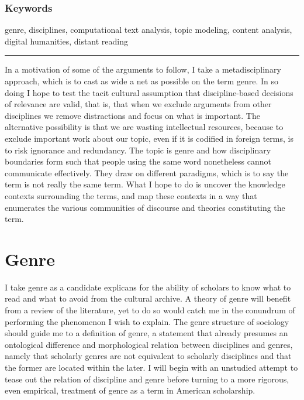 \documentclass[]{book}
\theoremstyle{definition}
\theoremstyle{definition}
\theoremstyle{definition}
\theoremstyle{remark}
\begin{document}
\hypertarget{keywords-2}{%
\subsubsection*{Keywords}\label{keywords-2}}


genre, disciplines, computational text analysis, topic
modeling, content analysis, digital humanities, distant reading

\begin{center}\rule{0.5\linewidth}{\linethickness}\end{center}

In a motivation of some of the arguments to follow, I take a
metadisciplinary approach, which is to cast as wide a net as possible on
the term genre. In so doing I hope to test the tacit cultural assumption
that discipline-based decisions of relevance are valid, that is, that
when we exclude arguments from other disciplines we remove distractions
and focus on what is important. The alternative possibility is that we
are wasting intellectual resources, because to exclude important work
about our topic, even if it is codified in foreign terms, is to risk
ignorance and redundancy. The topic is genre and how disciplinary
boundaries form such that people using the same word nonetheless cannot
communicate effectively. They draw on different paradigms, which is to
say the term is not really the same term. What I hope to do is uncover
the knowledge contexts surrounding the terms, and map these contexts in
a way that enumerates the various communities of discourse and theories
constituting the term.

\hypertarget{genre}{%
\section{Genre}\label{genre}}

I take genre as a candidate explicans for the ability of scholars to
know what to read and what to avoid from the cultural archive. A theory
of genre will benefit from a review of the literature, yet to do so
would catch me in the conundrum of performing the phenomenon I wish to
explain. The genre structure of sociology should guide me to a
definition of genre, a statement that already presumes an ontological
difference and morphological relation between disciplines and genres,
namely that scholarly genres are not equivalent to scholarly disciplines
and that the former are located within the later. I will begin with an
unstudied attempt to tease out the relation of discipline and genre
before turning to a more rigorous, even empirical, treatment of genre as
a term in American scholarship.
\end{document}
